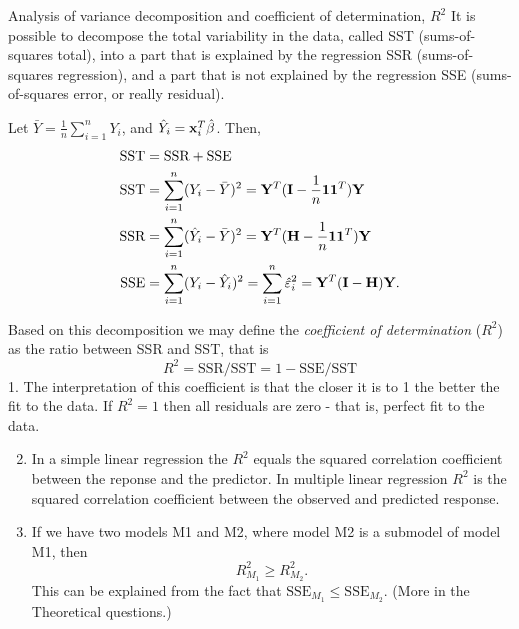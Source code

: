 \documentclass[
  ignorenonframetext,
]{beamer}
\begin{document}
\begin{frame}{Analysis of variance decomposition and coefficient of
determination, \(R^2\)}
\label{analysis-of-variance-decomposition-and-coefficient-of-determination-r2}
It is possible to decompose the total variability in the data, called
SST (sums-of-squares total), into a part that is explained by the
regression SSR (sums-of-squares regression), and a part that is not
explained by the regression SSE (sums-of-squares error, or really
residual).

Let \(\bar{Y}=\frac{1}{n}\sum_{i=1}^n Y_i\), and
\(\hat{Y}_i={\bf x}_i^T\hat{\beta}\). Then, \begin{align*} 
\text{SST}&=\text{SSR}+\text{SSE}\\
\text{SST}&=\sum_{i=1}^n (Y_i-\bar{Y})^2={\bf Y}^T({\bf I}-\frac{1}{n}{\bf 1 1}^T){\bf Y}\\
\text{SSR}&=\sum_{i=1}^n (\hat{Y}_i-\bar{Y})^2={\bf Y}^T({\bf H}-\frac{1}{n}{\bf 1 1}^T){\bf Y}\\
\text{SSE}&=\sum_{i=1}^n (Y_i-\hat{Y}_i)^2=\sum_{i=1}^n \hat{\varepsilon}_i^2={\bf Y}^T({\bf I}-{\bf H}){\bf Y}.\\
\end{align*}
\end{frame}

\begin{frame}
Based on this decomposition we may define the \emph{coefficient of
determination} (\(R^2\)) as the ratio between SSR and SST, that is
\[R^2=\text{SSR}/\text{SST}=1-\text{SSE}/\text{SST}\] 1. The
interpretation of this coefficient is that the closer it is to 1 the
better the fit to the data. If \(R^2=1\) then all residuals are zero -
that is, perfect fit to the data.

\begin{enumerate}
\setcounter{enumi}{1}
\item
  In a simple linear regression the \(R^2\) equals the squared
  correlation coefficient between the reponse and the predictor. In
  multiple linear regression \(R^2\) is the squared correlation
  coefficient between the observed and predicted response.
\item
  If we have two models M1 and M2, where model M2 is a submodel of model
  M1, then \[ R^2_{M_1}\ge R^2_{M_2}.\] This can be explained from the
  fact that \(\text{SSE}_{M_1}\le \text{SSE}_{M_2}\). (More in the
  Theoretical questions.)
\end{enumerate}
\end{frame}
\end{document}
